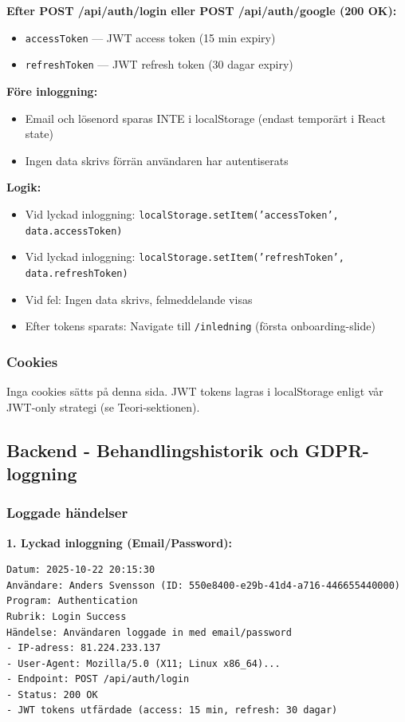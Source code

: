 \documentclass[12pt,a4paper]{article}
\begin{document}
\textbf{Efter POST /api/auth/login eller POST /api/auth/google (200 OK):}
\begin{itemize}[noitemsep]
  \item \texttt{accessToken} — JWT access token (15 min expiry)
  \item \texttt{refreshToken} — JWT refresh token (30 dagar expiry)
\end{itemize}

\textbf{Före inloggning:}
\begin{itemize}[noitemsep]
  \item Email och lösenord sparas INTE i localStorage (endast temporärt i React state)
  \item Ingen data skrivs förrän användaren har autentiserats
\end{itemize}

\textbf{Logik:}
\begin{itemize}[noitemsep]
  \item Vid lyckad inloggning: \texttt{localStorage.setItem('accessToken', data.accessToken)}
  \item Vid lyckad inloggning: \texttt{localStorage.setItem('refreshToken', data.refreshToken)}
  \item Vid fel: Ingen data skrivs, felmeddelande visas
  \item Efter tokens sparats: Navigate till \texttt{/inledning} (första onboarding-slide)
\end{itemize}

\subsubsection{Cookies}
Inga cookies sätts på denna sida. JWT tokens lagras i localStorage enligt vår JWT-only strategi (se Teori-sektionen).

\subsection{Backend - Behandlingshistorik och GDPR-loggning}

\subsubsection{Loggade händelser}

\textbf{1. Lyckad inloggning (Email/Password):}
\begin{verbatim}
Datum: 2025-10-22 20:15:30
Användare: Anders Svensson (ID: 550e8400-e29b-41d4-a716-446655440000)
Program: Authentication
Rubrik: Login Success
Händelse: Användaren loggade in med email/password
- IP-adress: 81.224.233.137
- User-Agent: Mozilla/5.0 (X11; Linux x86_64)...
- Endpoint: POST /api/auth/login
- Status: 200 OK
- JWT tokens utfärdade (access: 15 min, refresh: 30 dagar)
\end{verbatim}
\end{document}
